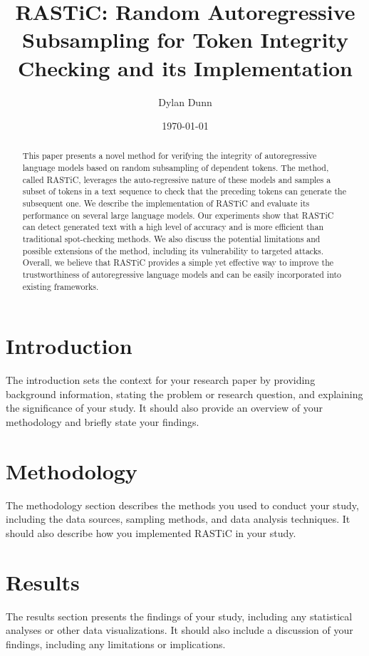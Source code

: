 \documentclass{article}
\title{RASTiC: Random Autoregressive Subsampling for Token Integrity Checking and its Implementation}
\author{Dylan Dunn}
\date{\today}
\begin{document}
\maketitle

\begin{abstract}
This paper presents a novel method for verifying the integrity of autoregressive language models based on random subsampling of dependent tokens. The method, called RASTiC, leverages the auto-regressive nature of these models and samples a subset of tokens in a text sequence to check that the preceding tokens can generate the subsequent one. We describe the implementation of RASTiC and evaluate its performance on several large language models. Our experiments show that RASTiC can detect generated text with a high level of accuracy and is more efficient than traditional spot-checking methods. We also discuss the potential limitations and possible extensions of the method, including its vulnerability to targeted attacks. Overall, we believe that RASTiC provides a simple yet effective way to improve the trustworthiness of autoregressive language models and can be easily incorporated into existing frameworks.
\end{abstract}


\section{Introduction}
The introduction sets the context for your research paper by providing background information, stating the problem or research question, and explaining the significance of your study. It should also provide an overview of your methodology and briefly state your findings.

\section{Methodology}
The methodology section describes the methods you used to conduct your study, including the data sources, sampling methods, and data analysis techniques. It should also describe how you implemented RASTiC in your study.

\section{Results}
The results section presents the findings of your study, including any statistical analyses or other data visualizations. It should also include a discussion of your findings, including any limitations or implications.
\end{document}
